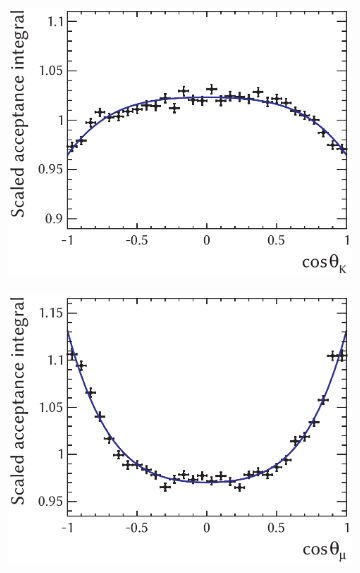 \begin{figure}[tbp]
  \centering
  \begin{subfigure}{0.49\textwidth}
    \includegraphics[width=\textwidth]{graphics/analysis/angAcc_ctk}
    \caption{}
    \label{fig:angAcc_ctk}
  \end{subfigure}%
  \hfill%
  \begin{subfigure}{0.49\textwidth}
    \includegraphics[width=\textwidth]{graphics/analysis/angAcc_ctl}
    \caption{}
    \label{fig:angAcc_ctl}
  \end{subfigure}


\end{figure}

